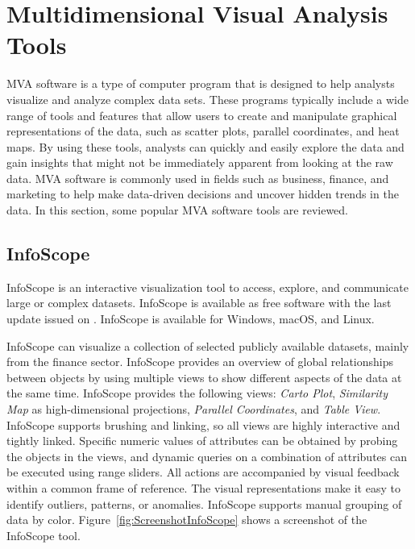 
\chapter{Multidimensional Visual Analysis Tools}

\label{chap:MVATools}

MVA software is a type of computer program that is designed to help
analysts visualize and analyze complex data sets. These programs typically
include a wide range of tools and features that allow users to create and
manipulate graphical representations of the data, such as scatter plots,
parallel coordinates, and heat maps. By using these tools, analysts can
quickly and easily explore the data and gain insights that might not be
immediately apparent from looking at the raw data. MVA software is
commonly used in fields such as business, finance, and marketing to help
make data-driven decisions and uncover hidden trends in the data. In this
section, some popular MVA software tools are reviewed.




\section{InfoScope}

InfoScope \parencite{InfoScope} is an interactive visualization tool
to access, explore, and communicate large or complex
datasets. InfoScope is available as free software with the last update
issued on . InfoScope is available for Windows, 
macOS, and Linux.

InfoScope can visualize a collection of selected publicly available
datasets, mainly from the finance sector. InfoScope provides an overview
of global relationships between objects by using multiple views to show
different aspects of the data at the same time. InfoScope provides the
following views: \emph{Carto Plot}, \emph{Similarity Map} as
high-dimensional projections, \emph{Parallel Coordinates}, and \emph{Table
View}. InfoScope supports brushing and linking, so all views are highly
interactive and tightly linked. Specific numeric values of attributes can
be obtained by probing the objects in the views, and dynamic queries on a
combination of attributes can be executed using range sliders. All actions
are accompanied by visual feedback within a common frame of reference. The
visual representations make it easy to identify outliers, patterns, or
anomalies. InfoScope supports manual grouping of data by color.
Figure~\ref{fig:ScreenshotInfoScope} shows a screenshot of the InfoScope
tool.




